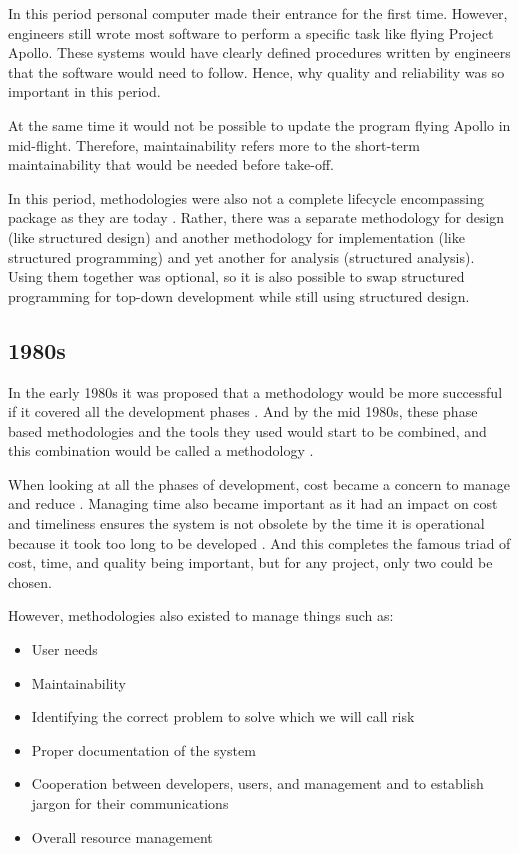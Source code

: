 In this period personal computer made their entrance for the first time.
However, engineers still wrote most software to perform a specific task like flying Project Apollo.
These systems would have clearly defined procedures written by engineers that the software would need to follow.
Hence, why quality and reliability was so important in this period.

At the same time it would not be possible to update the program flying Apollo in mid-flight.
Therefore, maintainability refers more to the short-term maintainability that would be needed before take-off.

In this period, methodologies were also not a complete lifecycle encompassing package as they are today \cite{soi_1982, beregi_1985}.
Rather, there was a separate methodology for design (like structured design) and another methodology for implementation (like structured programming) and yet another for analysis (structured analysis).
Using them together was optional, so it is also possible to swap structured programming for top-down development while still using structured design. \cite{yourdon_1977}

\subsection{1980s}
In the early 1980s it was proposed that a methodology would be more successful if it covered all the development phases \cite{soi_1982}.
And by the mid 1980s, these phase based methodologies and the tools they used would start to be combined, and this combination would be called a methodology \cite{beregi_1985}.

When looking at all the phases of development, cost became a concern to manage and reduce \cite{vanderlei_1983, peacham_1985, loesh_1985}.
Managing time also became important as it had an impact on cost and timeliness ensures the system is not obsolete by the time it is operational because it took too long to be developed \cite{peacham_1985, beregi_1985, mannino_1987, paul_1993}.
And this completes the famous triad of cost, time, and quality being important, but for any project, only two could be chosen.

However, methodologies also existed to manage things such as:
\begin{itemize}
    \item User needs \cite{peacham_1985}
    \item Maintainability \cite{peacham_1985}
    \item Identifying the correct problem to solve which we will call risk \cite{peacham_1985}
    \item Proper documentation of the system \cite{loesh_1985}
    \item Cooperation between developers, users, and management and to establish jargon for their communications \cite{loesh_1985}
    \item Overall resource management \cite{mannino_1987}
\end{itemize}

